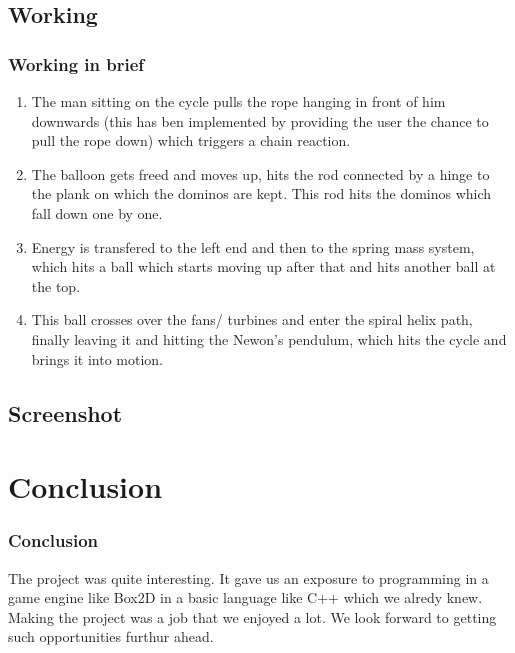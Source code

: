 \documentclass{beamer}
\begin{document}
\subsection{Working}
\begin{frame}
\frametitle{Working in brief}
\begin{enumerate}
\item {} The man sitting on the cycle pulls the rope hanging in front of him downwards (this has ben implemented by providing the user the chance to pull the rope down) which triggers a chain reaction.
\item {} The balloon gets freed and moves up, hits the rod connected by a hinge to the plank on which the dominos are kept. This rod hits the dominos which fall down one by one. 
\item {} Energy is transfered to the left end and then to the spring mass system, which hits a ball which starts moving up after that and hits another ball at the top.
\item {} This ball crosses over the fans/ turbines and enter the spiral helix path, finally leaving it and hitting the Newon's pendulum, which hits the cycle and brings it into motion.
\end{enumerate}

\end{frame}
\subsection{Screenshot}
\begin{frame}
\end{frame} 

\section{Conclusion}
\begin{frame}
\frametitle{Conclusion}
The project was quite interesting. It gave us an exposure to programming in a game engine like Box2D in a basic language like C++ which we alredy knew. Making the project was a job that we enjoyed a lot. We look forward to getting such opportunities furthur ahead.\\
\end{frame}
\end{document}
